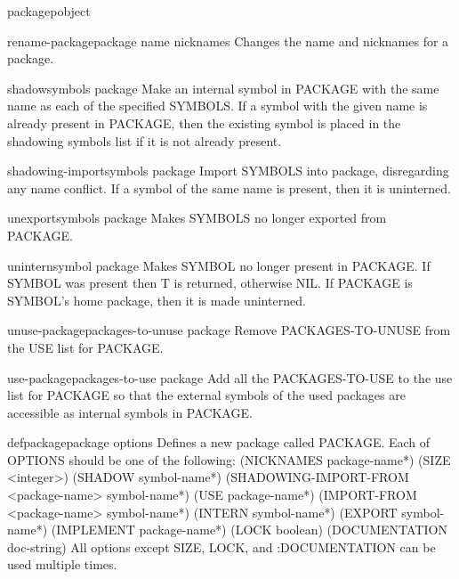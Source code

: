 \documentclass[10pt,english]{book}
\begin{document}
\begin{function}{packagep}{object}
  
\end{function}

\begin{function}{rename-package}{package name \op nicknames}
  Changes the name and nicknames for a package.
\end{function}

\begin{function}{shadow}{symbols \op package}
  Make an internal symbol in PACKAGE with the same name as each of the
specified SYMBOLS. If a symbol with the given name is already present in
PACKAGE, then the existing symbol is placed in the shadowing symbols list if
it is not already present.
\end{function}

\begin{function}{shadowing-import}{symbols \op package}
  Import SYMBOLS into package, disregarding any name conflict. If
  a symbol of the same name is present, then it is uninterned.
\end{function}

\begin{function}{unexport}{symbols \op package}
  Makes SYMBOLS no longer exported from PACKAGE.
\end{function}

\begin{function}{unintern}{symbol \op package}
  Makes SYMBOL no longer present in PACKAGE. If SYMBOL was present then T is
returned, otherwise NIL. If PACKAGE is SYMBOL's home package, then it is made
uninterned.
\end{function}

\begin{function}{unuse-package}{packages-to-unuse \op package}
  Remove PACKAGES-TO-UNUSE from the USE list for PACKAGE.
\end{function}

\begin{function}{use-package}{packages-to-use \op package}
  Add all the PACKAGES-TO-USE to the use list for PACKAGE so that the
external symbols of the used packages are accessible as internal symbols in
PACKAGE.
\end{function}

\begin{macro}{defpackage}{package \rest options}
  Defines a new package called PACKAGE. Each of OPTIONS should be one of the
   following: 
    (NICKNAMES {package-name}*)
    (SIZE <integer>)
    (SHADOW {symbol-name}*)
    (SHADOWING-IMPORT-FROM <package-name> {symbol-name}*)
    (USE {package-name}*)
    (IMPORT-FROM <package-name> {symbol-name}*)
    (INTERN {symbol-name}*)
    (EXPORT {symbol-name}*)
    (IMPLEMENT {package-name}*)
    (LOCK boolean)
    (DOCUMENTATION doc-string)
   All options except SIZE, LOCK, and :DOCUMENTATION can be used multiple
   times.
\end{macro}
\end{document}
